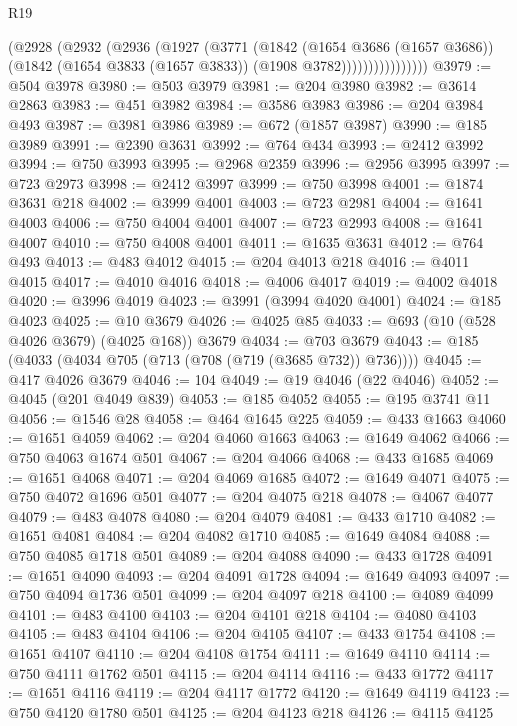 \begin{lexlean}{R19}
\begin{coremodule}
{{{{{{{{{{{                    (@2928
                      (@2932
                        (@2936
                          (@1927
                            (@3771
                              (@1842
                                (@1654 @3686 (@1657 @3686))
                                (@1842 (@1654 @3833 (@1657 @3833)) (@1908 @3782))))))))))))))))
@3979 := @504 @3978
@3980 := @503 @3979
@3981 := @204 @3980
@3982 := @3614 @2863
@3983 := @451 @3982
@3984 := @3586 @3983
@3986 := @204 @3984 @493
@3987 := @3981 @3986
@3989 := @672 (@1857 @3987)
@3990 := @185 @3989
@3991 := @2390 @3631
@3992 := @764 @434
@3993 := @2412 @3992
@3994 := @750 @3993
@3995 := @2968 @2359
@3996 := @2956 @3995
@3997 := @723 @2973
@3998 := @2412 @3997
@3999 := @750 @3998
@4001 := @1874 @3631 @218
@4002 := @3999 @4001
@4003 := @723 @2981
@4004 := @1641 @4003
@4006 := @750 @4004 @4001
@4007 := @723 @2993
@4008 := @1641 @4007
@4010 := @750 @4008 @4001
@4011 := @1635 @3631
@4012 := @764 @493
@4013 := @483 @4012
@4015 := @204 @4013 @218
@4016 := @4011 @4015
@4017 := @4010 @4016
@4018 := @4006 @4017
@4019 := @4002 @4018
@4020 := @3996 @4019
@4023 := @3991 (@3994 @4020 @4001)
@4024 := @185 @4023
@4025 := @10 @3679
@4026 := @4025 @85
@4033 := @693 (@10 (@528 @4026 @3679) (@4025 @168)) @3679
@4034 := @703 @3679
@4043 := @185 (@4033 (@4034 @705 (@713 (@708 (@719 (@3685 @732)) @736))))
@4045 := @417 @4026 @3679
@4046 := 104
@4049 := @19 @4046 (@22 @4046)
@4052 := @4045 (@201 @4049 @839)
@4053 := @185 @4052
@4055 := @195 @3741 @11
@4056 := @1546 @28
@4058 := @464 @1645 @225
@4059 := @433 @1663
@4060 := @1651 @4059
@4062 := @204 @4060 @1663
@4063 := @1649 @4062
@4066 := @750 @4063 @1674 @501
@4067 := @204 @4066
@4068 := @433 @1685
@4069 := @1651 @4068
@4071 := @204 @4069 @1685
@4072 := @1649 @4071
@4075 := @750 @4072 @1696 @501
@4077 := @204 @4075 @218
@4078 := @4067 @4077
@4079 := @483 @4078
@4080 := @204 @4079
@4081 := @433 @1710
@4082 := @1651 @4081
@4084 := @204 @4082 @1710
@4085 := @1649 @4084
@4088 := @750 @4085 @1718 @501
@4089 := @204 @4088
@4090 := @433 @1728
@4091 := @1651 @4090
@4093 := @204 @4091 @1728
@4094 := @1649 @4093
@4097 := @750 @4094 @1736 @501
@4099 := @204 @4097 @218
@4100 := @4089 @4099
@4101 := @483 @4100
@4103 := @204 @4101 @218
@4104 := @4080 @4103
@4105 := @483 @4104
@4106 := @204 @4105
@4107 := @433 @1754
@4108 := @1651 @4107
@4110 := @204 @4108 @1754
@4111 := @1649 @4110
@4114 := @750 @4111 @1762 @501
@4115 := @204 @4114
@4116 := @433 @1772
@4117 := @1651 @4116
@4119 := @204 @4117 @1772
@4120 := @1649 @4119
@4123 := @750 @4120 @1780 @501
@4125 := @204 @4123 @218
@4126 := @4115 @4125
}}}}}}}}}}}
\end{coremodule}
\end{lexlean}
